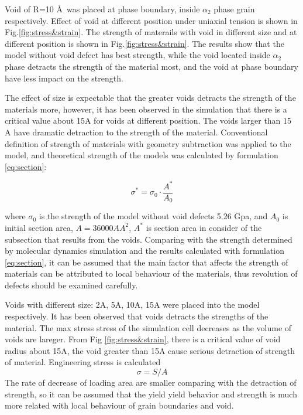 \documentclass[materials,article,submit,moreauthors,pdftex,10pt,a4paper]{Definitions/mdpi}
\begin{document}
Void of R=10 \AA\ was placed at phase boundary, inside $\alpha_2$ phase grain respectively. Effect of void at different position under uniaxial tension is shown in Fig.\ref{fig:stress&strain}. The strength of materails with void in different size and at different position is shown in Fig.\ref{fig:stress&strain}. The results show that the model without void defect has best strength, while the void located inside $\alpha_2$ phase detracts the strength of the material most, and the void at phase boundary have less impact on the strength.
	
The effect of size is expectable that the greater voids detracts the strength of the materials more, however, it has been observed in the simulation that there is a critical value about 15A for voids at different position. The voids larger than 15 A have dramatic detraction to the strength of the material. Conventional definition of strength of materials with geometry subtraction was applied to the model, and theoretical strength of the models was calculated by formulation \ref{eq:section}:
	
	\begin{equation} \label{eq:section} 
	\sigma^* = \sigma_0 \cdot \frac{A^*}{A_0}
	\end{equation}
	
where $\sigma_0$ is the strength of the model without void defects 5.26 Gpa, and $A_0$ is initial section area, $ A = 36000 {AA}^2$, $A^* $ is section area in consider of the subsection that results from the voids. Comparing with the strength determined by molecular dynamics simulation and the results calculated with formulation \ref{eq:section}, it can be assumed that the main factor that affects the strength of materials can be attributed to local behaviour of the materials, thus revolution of defects should be examined carefully.

	
Voids with different size: 2A, 5A, 10A, 15A were placed into the model respectively. It has been observed that voids detracts the strengths of the material. The max stress stress of the simulation cell decreases as the volume of voids are lareger. From Fig \ref{fig:stress&strain}, there is a critical value of void radius about 15A, the void greater than 15A cause serious detraction of strength of material. 
Engineering stress is calculated
	$$ \sigma = S/A$$
The rate of decrease of loading area are smaller comparing with the detraction of strength, so it can be assumed that the yield yield behavior and strength is much more related with local behaviour of grain boundaries and void.
	
\end{document}
